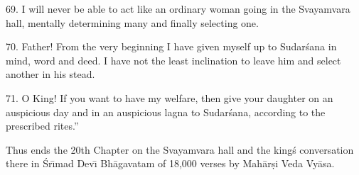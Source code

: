 69. I will never be able to act like an ordinary woman going in the Svayamvara hall, mentally determining many and finally selecting one.

70. Father! From the very beginning I have given myself up to Sudar\'sana in mind, word and deed. I have not the least inclination to leave him and select another in his stead.

71. O King! If you want to have my welfare, then give your daughter on an auspicious day and in an auspicious lagna to Sudar\'sana, according to the prescribed rites.''

Thus ends the 20th Chapter on the Svayamvara hall and the king\'s conversation there in \'Sr\={\i}mad Dev\={\i} Bh\=agavatam of 18,000 verses by Mah\=ar\d{s}i Veda Vy\=asa.



